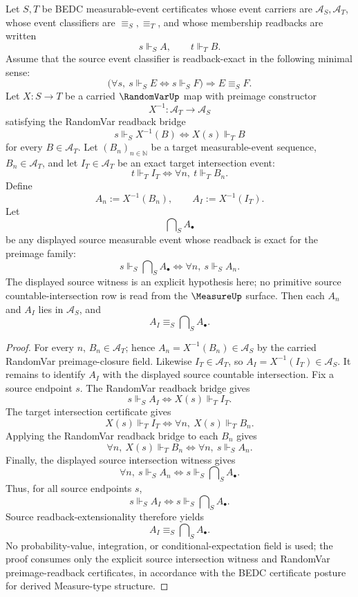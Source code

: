 \begin{theorem}
\label{thm:randomvar-countable-preimage-intersection-exactness}
Let $S,T$ be BEDC measurable-event certificates whose event carriers are
$\mathcal A_S,\mathcal A_T$, whose event classifiers are $\equiv_S,\equiv_T$, and whose
membership readbacks are written
$$
s\Vdash_S A,\qquad t\Vdash_T B.
$$
Assume that the source event classifier is readback-exact in the following minimal sense:
$$
\bigl(\forall s,\ s\Vdash_S E \Longleftrightarrow s\Vdash_S F\bigr)\Longrightarrow E\equiv_S F.
$$
Let $X:S\to T$ be a carried $\RandomVarUp$ map with preimage constructor
$$
X^{-1}:\mathcal A_T\longrightarrow \mathcal A_S
$$
satisfying the RandomVar readback bridge
$$
s\Vdash_S X^{-1}(B)\Longleftrightarrow X(s)\Vdash_T B
$$
for every $B\in\mathcal A_T$. Let $(B_n)_{n\in\mathbb N}$ be a target measurable-event sequence,
$B_n\in\mathcal A_T$, and let $I_T\in\mathcal A_T$ be an exact target intersection event:
$$
t\Vdash_T I_T \Longleftrightarrow \forall n,\ t\Vdash_T B_n.
$$
Define
$$
A_n:=X^{-1}(B_n),\qquad A_I:=X^{-1}(I_T).
$$
Let
$$
\bigcap\nolimits_S A_\bullet
$$
be any displayed source measurable event whose readback is exact for the preimage family:
$$
s\Vdash_S \bigcap\nolimits_S A_\bullet
\Longleftrightarrow
\forall n,\ s\Vdash_S A_n.
$$
The displayed source witness is an explicit hypothesis here; no primitive source countable-intersection row is read from the $\MeasureUp$ surface.
Then each $A_n$ and $A_I$ lies in $\mathcal A_S$, and
$$
A_I\equiv_S \bigcap\nolimits_S A_\bullet.
$$
\end{theorem}
\begin{proof}
For every $n$, $B_n\in\mathcal A_T$; hence $A_n=X^{-1}(B_n)\in\mathcal A_S$ by the carried
RandomVar preimage-closure field. Likewise $I_T\in\mathcal A_T$, so
$A_I=X^{-1}(I_T)\in\mathcal A_S$.
It remains to identify $A_I$ with the displayed source countable intersection. Fix a source endpoint $s$.
The RandomVar readback bridge gives
$$
s\Vdash_S A_I
\Longleftrightarrow
X(s)\Vdash_T I_T.
$$
The target intersection certificate gives
$$
X(s)\Vdash_T I_T
\Longleftrightarrow
\forall n,\ X(s)\Vdash_T B_n.
$$
Applying the RandomVar readback bridge to each $B_n$ gives
$$
\forall n,\ X(s)\Vdash_T B_n
\Longleftrightarrow
\forall n,\ s\Vdash_S A_n.
$$
Finally, the displayed source intersection witness gives
$$
\forall n,\ s\Vdash_S A_n
\Longleftrightarrow
s\Vdash_S \bigcap\nolimits_S A_\bullet.
$$
Thus, for all source endpoints $s$,
$$
s\Vdash_S A_I
\Longleftrightarrow
s\Vdash_S \bigcap\nolimits_S A_\bullet.
$$
Source readback-extensionality therefore yields
$$
A_I\equiv_S \bigcap\nolimits_S A_\bullet.
$$
No probability-value, integration, or conditional-expectation field is used; the proof consumes only the explicit source intersection witness and RandomVar preimage-readback certificates, in accordance with the BEDC certificate posture for derived Measure-type structure.
\end{proof}

